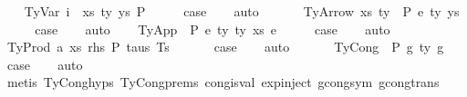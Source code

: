 \begin{isabellebody}
\ \ \isamarkupfalse%
\ {\isacharparenleft}{\kern0pt}TyVar\ i\ {\isasymGamma}\ xs\ ty\ ys\ P{\isacharparenright}{\kern0pt}\isanewline
\ \ \isamarkupfalse%
\ \isamarkupfalse%
\ {\isacharquery}{\kern0pt}case\isanewline
\ \ \isamarkupfalse%
\ auto\isanewline
\ \ \isamarkupfalse%
\isanewline
{}\isamarkupfalse%
\isanewline
\ \ \isamarkupfalse%
\ {\isacharparenleft}{\kern0pt}TyArrow\ xs\ ty{}\ {\isasymGamma}\ P\ e\ ty{}\ ys{\isacharparenright}{\kern0pt}\isanewline
\ \ \isamarkupfalse%
\ \isamarkupfalse%
\ {\isacharquery}{\kern0pt}case\isanewline
\ \ \isamarkupfalse%
\ auto\isanewline
{}\isamarkupfalse%
\isanewline
\ \ \isamarkupfalse%
\ {\isacharparenleft}{\kern0pt}TyApp\ {\isasymGamma}\ P\ e{}\ ty{}\ ty{}\ xs\ e{}{\isacharparenright}{\kern0pt}\isanewline
\ \ \isamarkupfalse%
\ \isamarkupfalse%
\ {\isacharquery}{\kern0pt}case\isanewline
\ \ \isamarkupfalse%
\ auto\isanewline
\ \ \isamarkupfalse%
\isanewline
{}\isamarkupfalse%
\isanewline
\ \ \isamarkupfalse%
\ {\isacharparenleft}{\kern0pt}TyProd\ a\ xs\ rhs\ P\ taus\ Ts\ {\isasymGamma}{\isacharparenright}{\kern0pt}\isanewline
\ \ \isamarkupfalse%
\ \isamarkupfalse%
\ {\isacharquery}{\kern0pt}case\isanewline
\ \ \isamarkupfalse%
\ auto\isanewline
\ \ \isamarkupfalse%
\isanewline
{}\isamarkupfalse%
\isanewline
\ \ \isamarkupfalse%
\ {\isacharparenleft}{\kern0pt}TyCong\ {\isasymGamma}\ P\ g{}\ ty\ g{}{\isacharparenright}{\kern0pt}\isanewline
\ \ \isamarkupfalse%
\ {\isacharquery}{\kern0pt}case\isanewline
\ \ \isamarkupfalse%
\ auto\isanewline
\ \ \isamarkupfalse%
\ {\isacharparenleft}{\kern0pt}metis\ TyCong{\isachardot}{\kern0pt}hyps{\isacharparenleft}{\kern0pt}{}{\isacharcomma}{\kern0pt}{}{\isacharparenright}{\kern0pt}\ TyCong{\isachardot}{\kern0pt}prems{\isacharparenleft}{\kern0pt}{}{\isacharcomma}{\kern0pt}{}{\isacharcomma}{\kern0pt}{}{\isacharparenright}{\kern0pt}\ cong{\isacharunderscore}{\kern0pt}is{\isacharunderscore}{\kern0pt}val\ exp{\isachardot}{\kern0pt}inject{\isacharparenleft}{\kern0pt}{}{\isacharparenright}{\kern0pt}\ gcong{\isachardot}{\kern0pt}sym\ gcong{\isachardot}{\kern0pt}trans{\isacharparenright}{\kern0pt}\ \isanewline

\end{isabellebody}
